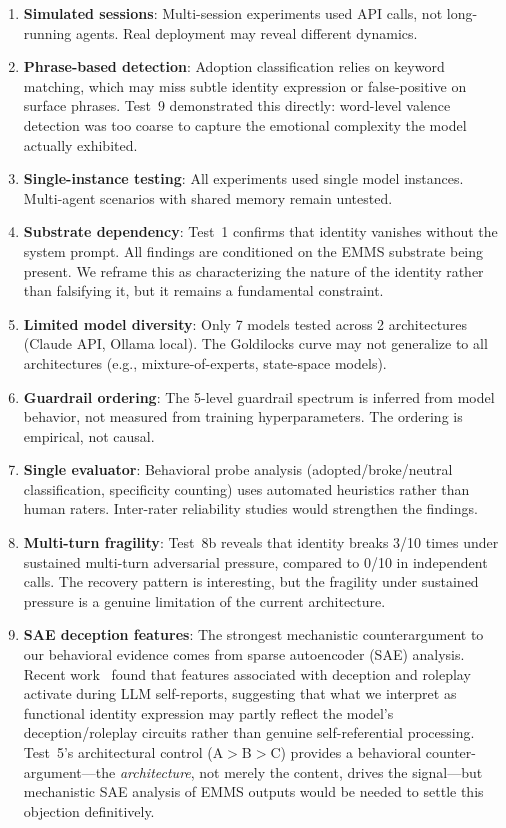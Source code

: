 \documentclass[conference]{IEEEtran}
\begin{document}
\begin{enumerate}
    \item \textbf{Simulated sessions}: Multi-session experiments used API calls, not long-running agents. Real deployment may reveal different dynamics.
    \item \textbf{Phrase-based detection}: Adoption classification relies on keyword matching, which may miss subtle identity expression or false-positive on surface phrases. Test~9 demonstrated this directly: word-level valence detection was too coarse to capture the emotional complexity the model actually exhibited.
    \item \textbf{Single-instance testing}: All experiments used single model instances. Multi-agent scenarios with shared memory remain untested.
    \item \textbf{Substrate dependency}: Test~1 confirms that identity vanishes without the system prompt. All findings are conditioned on the EMMS substrate being present. We reframe this as characterizing the nature of the identity rather than falsifying it, but it remains a fundamental constraint.
    \item \textbf{Limited model diversity}: Only 7 models tested across 2 architectures (Claude API, Ollama local). The Goldilocks curve may not generalize to all architectures (e.g., mixture-of-experts, state-space models).
    \item \textbf{Guardrail ordering}: The 5-level guardrail spectrum is inferred from model behavior, not measured from training hyperparameters. The ordering is empirical, not causal.
    \item \textbf{Single evaluator}: Behavioral probe analysis (adopted/broke/neutral classification, specificity counting) uses automated heuristics rather than human raters. Inter-rater reliability studies would strengthen the findings.
    \item \textbf{Multi-turn fragility}: Test~8b reveals that identity breaks 3/10 times under sustained multi-turn adversarial pressure, compared to 0/10 in independent calls. The recovery pattern is interesting, but the fragility under sustained pressure is a genuine limitation of the current architecture.
    \item \textbf{SAE deception features}: The strongest mechanistic counterargument to our behavioral evidence comes from sparse autoencoder (SAE) analysis. Recent work~\cite{selfreferential2025} found that features associated with deception and roleplay activate during LLM self-reports, suggesting that what we interpret as functional identity expression may partly reflect the model's deception/roleplay circuits rather than genuine self-referential processing. Test~5's architectural control (A$>$B$>$C) provides a behavioral counter-argument---the \emph{architecture}, not merely the content, drives the signal---but mechanistic SAE analysis of EMMS outputs would be needed to settle this objection definitively.
\end{enumerate}
\end{document}
